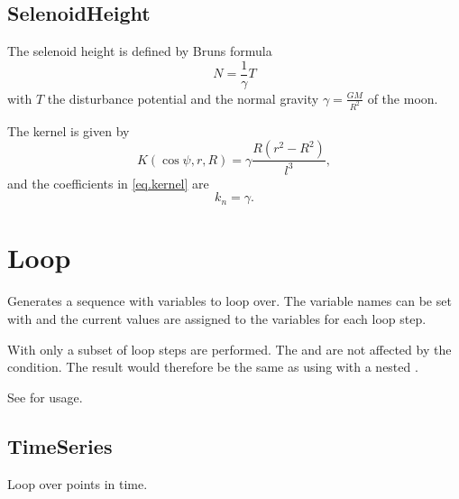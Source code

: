 \subsection{SelenoidHeight}
The selenoid height is defined by Bruns formula
\begin{equation}
N = \frac{1}{\gamma}T
\end{equation}
with $T$ the disturbance potential and the normal gravity $\gamma=\frac{GM}{R^2}$ of the moon.

The kernel is given by
\begin{equation}
K(\cos\psi,r,R) = \gamma\frac{R(r^2-R^2)}{l^3},
\end{equation}
and the coefficients in \eqref{eq.kernel} are
\begin{equation}
k_n = \gamma.
\end{equation}

\clearpage

\section{Loop}\label{loopType}
Generates a sequence with variables to loop over.
The variable names can be set with  and
the current values are assigned to the variables for each loop step.

With  only a subset of loop steps are performed.
The  and  are not affected by the condition.
The result would therefore be the same as using  with a nested .

See  for usage.


\subsection{TimeSeries}\label{loopType:timeSeries}
Loop over points in time.


